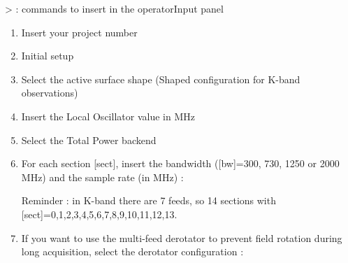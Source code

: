 \documentclass[letterpaper,10pt,english]{sphinxmanual}
\begin{document}
\textgreater{} : commands to insert in the operatorInput panel
\begin{enumerate}
\item {} 
Insert your project number
\begin{quote}

\end{quote}

\item {} 
Initial setup
\begin{quote}


\end{quote}

\item {} 
Select the active surface shape (Shaped configuration for K-band observations)
\begin{quote}

\end{quote}

\item {} 
Insert the Local Oscillator value in MHz
\begin{quote}

\end{quote}

\item {} 
Select the Total Power backend
\begin{quote}

\end{quote}

\item {} 
For each section {[}sect{]}, insert the bandwidth ({[}bw{]}=300, 730, 1250 or 2000 MHz) and the sample rate (in MHz) :
\begin{quote}

\end{quote}

Reminder : in K-band there are 7 feeds, so 14 sections with {[}sect{]}=0,1,2,3,4,5,6,7,8,9,10,11,12,13.

\item {} 
If you want to use the multi-feed derotator to prevent field rotation during long acquisition, select the derotator configuration :
\begin{quote}


\end{quote}
\end{enumerate}
\end{document}
